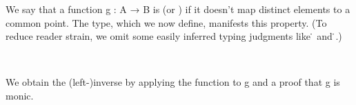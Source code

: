 We say that a function \ab g \as : \ab A \as → \ab B is  (or ) if it doesn't map distinct elements to a common point. The  type, which we now define, manifests this property. (To reduce reader strain, we omit some easily inferred typing judgments like  \as{:} \af ̇ and  
\as{:} \af ̇.)
\ccpad
\begin{code}%
\>[1]\AgdaSpace{}%
\AgdaSymbol{:}\AgdaSpace{}%
\AgdaSymbol{(}\AgdaSpace{}%
\AgdaSymbol{:}\AgdaSpace{}%
\AgdaSpace{}%
\AgdaSpace{}%
\AgdaSymbol{)}\AgdaSpace{}%
\AgdaSpace{}%
\AgdaSpace{}%
\AgdaSpace{}%
\AgdaSpace{}%
\<%
\\
%
\>[1]\AgdaSpace{}%
\AgdaSpace{}%
\AgdaSymbol{=}\AgdaSpace{}%
\AgdaSpace{}%
\AgdaSpace{}%
\AgdaSpace{}%
\AgdaSpace{}%
\AgdaSpace{}%
\AgdaSpace{}%
\AgdaSpace{}%
\AgdaSpace{}%
\AgdaSpace{}%
\AgdaSpace{}%
\AgdaSpace{}%
\AgdaSpace{}%
\<%
\end{code}
\ccpad
We obtain the (left-)inverse by applying the function  to \ab g and a proof that \ab g is monic.
\ccpad
\begin{code}%
\>[1]\AgdaSpace{}%
\AgdaSymbol{:}\AgdaSpace{}%
\AgdaSymbol{(}\AgdaSpace{}%
\AgdaSymbol{:}\AgdaSpace{}%
\AgdaSpace{}%
\AgdaSpace{}%
\AgdaSymbol{)}\AgdaSpace{}%
\AgdaSpace{}%
\AgdaSpace{}%
\AgdaSpace{}%
\AgdaSpace{}%
\AgdaSymbol{(}\AgdaSpace{}%
\AgdaSymbol{:}\AgdaSpace{}%
\AgdaSymbol{)}\AgdaSpace{}%
\AgdaSpace{}%
\AgdaSpace{}%
\AgdaSpace{}%
\AgdaSpace{}%
\AgdaSpace{}%
\AgdaSpace{}%
\<%
\\
%
\>[1]\AgdaSpace{}%
\AgdaSpace{}%
\AgdaSymbol{\AgdaUnderscore{}}\AgdaSpace{}%
\AgdaSymbol{=}\AgdaSpace{}%
\AgdaSpace{}%
\AgdaSpace{}%
\AgdaSpace{}%
\AgdaSpace{}%
\AgdaSpace{}%
\AgdaSpace{}%
\<%
\end{code}

